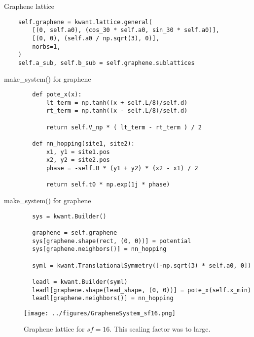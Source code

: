 \documentclass{beamer}
\begin{document}
\begin{frame}[fragile]{Graphene lattice}
	\begin{verbatim}
    self.graphene = kwant.lattice.general(
        [(0, self.a0), (cos_30 * self.a0, sin_30 * self.a0)],
        [(0, 0), (self.a0 / np.sqrt(3), 0)],
        norbs=1,
    )
    self.a_sub, self.b_sub = self.graphene.sublattices
    \end{verbatim}
\end{frame}

\begin{frame}[fragile]{make\_system() for graphene}
	\begin{verbatim}
        def pote_x(x):
            lt_term = np.tanh((x + self.L/8)/self.d)
            rt_term = np.tanh((x - self.L/8)/self.d)

            return self.V_np * ( lt_term - rt_term ) / 2

        def nn_hopping(site1, site2):
            x1, y1 = site1.pos
            x2, y2 = site2.pos
            phase = -self.B * (y1 + y2) * (x2 - x1) / 2

            return self.t0 * np.exp(1j * phase)
    \end{verbatim}
\end{frame}

\begin{frame}[fragile]{make\_system() for graphene}
	\begin{verbatim}
        sys = kwant.Builder()

        graphene = self.graphene
        sys[graphene.shape(rect, (0, 0))] = potential
        sys[graphene.neighbors()] = nn_hopping

        syml = kwant.TranslationalSymmetry([-np.sqrt(3) * self.a0, 0])

        leadl = kwant.Builder(syml)
        leadl[graphene.shape(lead_shape, (0, 0))] = pote_x(self.x_min)
        leadl[graphene.neighbors()] = nn_hopping
    \end{verbatim}
\end{frame}

\begin{frame}
	\begin{figure}
		\begin{center}
			\texttt{[image: ../figures/GrapheneSystem\_sf16.png]}
		\end{center}
		\caption{Graphene lattice for $sf = 16$. This scaling factor was to large.}
	\end{figure}
\end{frame}
\end{document}
